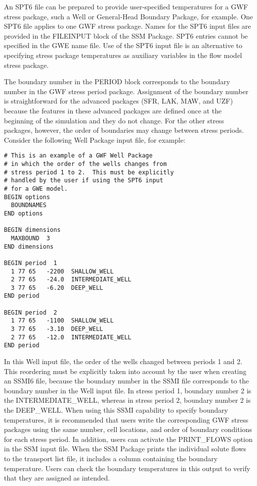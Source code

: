 An SPT6 file can be prepared to provide user-specified temperatures for a GWF stress package, such a Well or General-Head Boundary Package, for example.  One SPT6 file applies to one GWF stress package.  Names for the SPT6 input files are provided in the FILEINPUT block of the SSM Package.  SPT6 entries cannot be specified in the GWE name file.  Use of the SPT6 input file is an alternative to specifying stress package temperatures as auxiliary variables in the flow model stress package.  

The boundary number in the PERIOD block corresponds to the boundary number in the GWF stress period package.  Assignment of the boundary number is straightforward for the advanced packages (SFR, LAK, MAW, and UZF) because the features in these advanced packages are defined once at the beginning of the simulation and they do not change.  For the other stress packages, however, the order of boundaries may change between stress periods.  Consider the following Well Package input file, for example:

\begin{verbatim}
# This is an example of a GWF Well Package
# in which the order of the wells changes from
# stress period 1 to 2.  This must be explicitly
# handled by the user if using the SPT6 input
# for a GWE model.
BEGIN options
  BOUNDNAMES
END options

BEGIN dimensions
  MAXBOUND  3
END dimensions

BEGIN period  1
  1 77 65   -2200  SHALLOW_WELL
  2 77 65   -24.0  INTERMEDIATE_WELL
  3 77 65   -6.20  DEEP_WELL
END period

BEGIN period  2
  1 77 65   -1100  SHALLOW_WELL
  3 77 65   -3.10  DEEP_WELL
  2 77 65   -12.0  INTERMEDIATE_WELL
END period
\end{verbatim}

\noindent In this Well input file, the order of the wells changed between periods 1 and 2.  This reordering must be explicitly taken into account by the user when creating an SSMI6 file, because the boundary number in the SSMI file corresponds to the boundary number in the Well input file.  In stress period 1, boundary number 2 is the INTERMEDIATE\_WELL, whereas in stress period 2, boundary number 2 is the DEEP\_WELL.  When using this SSMI capability to specify boundary temperatures, it is recommended that users write the corresponding GWF stress packages using the same number, cell locations, and order of boundary conditions for each stress period.   In addition, users can activate the PRINT\_FLOWS option in the SSM input file.  When the SSM Package prints the individual solute flows to the transport list file, it includes a column containing the boundary temperature.  Users can check the boundary temperatures in this output to verify that they are assigned as intended.

